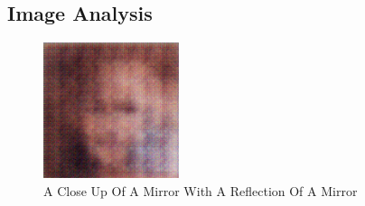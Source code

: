 \documentclass{article}%
\begin{document}
%
\subsection{Image Analysis}%
\label{subsec:ImageAnalysis}%


\begin{figure}[h!]%
\centering%
\includegraphics[width=150px]{500_fake_images/samples_5_401.png}%
\caption{A Close Up Of A Mirror With A Reflection Of A Mirror}%
\end{figure}

%
\end{document}
